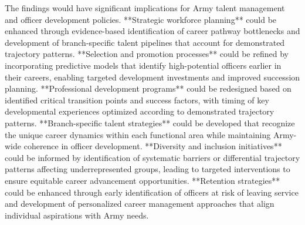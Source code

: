 \documentclass[main.tex]{subfiles}
\begin{document}

The findings would have significant implications for Army talent management and officer development policies. **Strategic workforce planning** could be enhanced through evidence-based identification of career pathway bottlenecks and development of branch-specific talent pipelines that account for demonstrated trajectory patterns. **Selection and promotion processes** could be refined by incorporating predictive models that identify high-potential officers earlier in their careers, enabling targeted development investments and improved succession planning. **Professional development programs** could be redesigned based on identified critical transition points and success factors, with timing of key developmental experiences optimized according to demonstrated trajectory patterns. **Branch-specific talent strategies** could be developed that recognize the unique career dynamics within each functional area while maintaining Army-wide coherence in officer development. **Diversity and inclusion initiatives** could be informed by identification of systematic barriers or differential trajectory patterns affecting underrepresented groups, leading to targeted interventions to ensure equitable career advancement opportunities. **Retention strategies** could be enhanced through early identification of officers at risk of leaving service and development of personalized career management approaches that align individual aspirations with Army needs.

\end{document}
